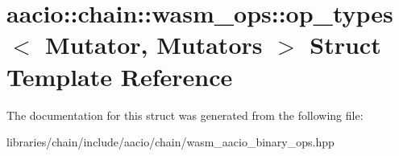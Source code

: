 \hypertarget{structaacio_1_1chain_1_1wasm__ops_1_1op__types}{}\section{aacio\+:\+:chain\+:\+:wasm\+\_\+ops\+:\+:op\+\_\+types$<$ Mutator, Mutators $>$ Struct Template Reference}
\label{structaacio_1_1chain_1_1wasm__ops_1_1op__types}


The documentation for this struct was generated from the following file\+:\begin{DoxyCompactItemize}
\item 
libraries/chain/include/aacio/chain/wasm\+\_\+aacio\+\_\+binary\+\_\+ops.\+hpp\end{DoxyCompactItemize}
